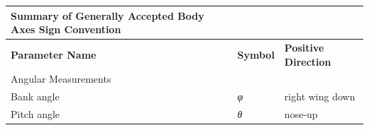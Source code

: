 \documentclass[
]{book}
\begin{document}
\begin{longtable}[]{@{}lll@{}}
\toprule
\begin{minipage}[b]{0.56\columnwidth}\raggedright
\textbf{Summary of Generally Accepted Body Axes Sign Convention}\strut
\end{minipage} & \begin{minipage}[b]{0.12\columnwidth}\raggedright
\strut
\end{minipage} & \begin{minipage}[b]{0.23\columnwidth}\raggedright
\strut
\end{minipage}\tabularnewline
\midrule
\endhead
\begin{minipage}[t]{0.56\columnwidth}\raggedright
\textbf{Parameter Name}\strut
\end{minipage} & \begin{minipage}[t]{0.12\columnwidth}\raggedright
\textbf{Symbol}\strut
\end{minipage} & \begin{minipage}[t]{0.23\columnwidth}\raggedright
\textbf{Positive Direction}\strut
\end{minipage}\tabularnewline
\begin{minipage}[t]{0.56\columnwidth}\raggedright
Angular Measurements\strut
\end{minipage} & \begin{minipage}[t]{0.12\columnwidth}\raggedright
\strut
\end{minipage} & \begin{minipage}[t]{0.23\columnwidth}\raggedright
\strut
\end{minipage}\tabularnewline
\begin{minipage}[t]{0.56\columnwidth}\raggedright
Bank angle\strut
\end{minipage} & \begin{minipage}[t]{0.12\columnwidth}\raggedright
\emph{φ}\strut
\end{minipage} & \begin{minipage}[t]{0.23\columnwidth}\raggedright
right wing down\strut
\end{minipage}\tabularnewline
\begin{minipage}[t]{0.56\columnwidth}\raggedright
Pitch angle\strut
\end{minipage} & \begin{minipage}[t]{0.12\columnwidth}\raggedright
\emph{θ}\strut
\end{minipage} & \begin{minipage}[t]{0.23\columnwidth}\raggedright
nose-up\strut

\end{minipage}
\end{longtable}
\end{document}
